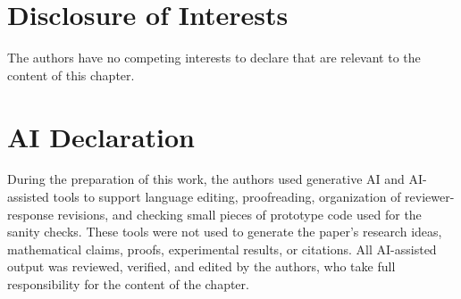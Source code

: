 \documentclass[runningheads]{llncs}
\begin{document}
\section*{Disclosure of Interests}
The authors have no competing interests to declare that are relevant to the content of this chapter.

\section*{AI Declaration}
During the preparation of this work, the authors used generative AI and AI-assisted tools to support language editing, proofreading, organization of reviewer-response revisions, and checking small pieces of prototype code used for the sanity checks. These tools were not used to generate the paper's research ideas, mathematical claims, proofs, experimental results, or citations. All AI-assisted output was reviewed, verified, and edited by the authors, who take full responsibility for the content of the chapter.



\end{document}
